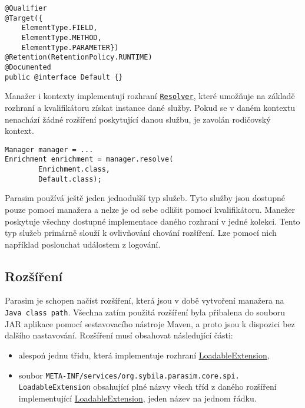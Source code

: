 \begin{lstlisting}[label={code:qualifier}, caption={Kvalikátor}]
@Qualifier
@Target({
	ElementType.FIELD,
	ElementType.METHOD,
	ElementType.PARAMETER})
@Retention(RetentionPolicy.RUNTIME)
@Documented
public @interface Default {}
\end{lstlisting}

Manažer i kontexty implementují rozhraní \href{https://github.com/sybila/parasim/blob/master/core/src/main/java/org/sybila/parasim/core/api/Resolver.java}{\texttt{Resolver}},
které umožňuje na základě rozhraní a kvalifikátoru získat instance dané služby.
Pokud se v daném kontextu nenachází žádné rozšíření poskytující danou službu,
je zavolán rodičovský kontext. 

\begin{lstlisting}[label={code:resolve}, caption={Získání instance služby}]
Manager manager = ...
Enrichment enrichment = manager.resolve(
		Enrichment.class,
		Default.class);
\end{lstlisting}

Parasim používá ještě jeden jednodušší typ služeb. Tyto služby jsou dostupné pouze
pomocí manažera a nelze je od sebe odlišit pomocí kvalifikátoru. Manežer poskytuje
všechny dostupné implementace daného rozhraní v jedné kolekci. Tento typ služeb
primárně  slouží k ovlivňování cho\-vání rozšíření. Lze pomocí nich například
poslouchat událostem z logování.

\subsection{Rozšíření}

Parasim je schopen načíst rozšíření, která jsou v době vytvoření manažera na \texttt{Java class path}.
Všechna zatím použitá rozšíření byla přibalena do souboru JAR aplikace pomocí sestavovacího
nástroje Maven, a proto jsou k dispozici bez dalšího nasta\-vo\-vá\-ní. Rozšíření musí obsahovat
následující části:

\begin{itemize}
	\item	alespoń jednu třidu, která implementuje rozhraní \href{https://github.com/sybila/parasim/blob/master/core/src/main/java/org/sybila/parasim/core/spi/LoadableExtension.java}{LoadableExtension},
	\item	soubor \texttt{META-INF/services/org.sybila.parasim.core.spi.\\LoadableExtension} obsahující plné názvy všech tříd z daného roz\-ší\-ření implementující \href{https://github.com/sybila/parasim/blob/master/core/src/main/java/org/sybila/parasim/core/spi/LoadableExtension.java}{LoadableExtension}, jeden název na jednom řád\-ku. 
\end{itemize}

